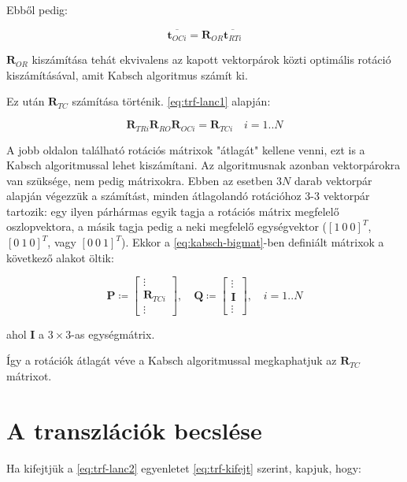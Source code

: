 	Ebből pedig:
	
	\begin{equation}
 	\overline{\mathbf{t}_{OCi}}	= \mathbf{R}_{OR} 	\overline{\mathbf{t}_{RTi}}
	\end{equation}
	
	$\mathbf{R}_{OR}$ kiszámítása tehát ekvivalens az kapott vektorpárok közti optimális rotáció kiszámításával, amit Kabsch algoritmus számít ki.
	
	Ez után $\mathbf{R}_{TC}$ számítása történik. \eqref{eq:trf-lanc1} alapján: 
	
	\begin{equation}
	\mathbf{R}_{TRi}\mathbf{R}_{RO}\mathbf{R}_{OCi} = \mathbf{R}_{TCi}\quad i = 1 .. N
	\end{equation}
	
	A jobb oldalon található rotációs mátrixok "átlagát" kellene venni, ezt is a Kabsch algoritmussal lehet kiszámítani. Az algoritmusnak azonban vektorpárokra van szüksége, nem pedig mátrixokra. Ebben az esetben $3N$ darab vektorpár alapján végezzük a számítást, minden átlagolandó rotációhoz 3-3 vektorpár tartozik: egy ilyen párhármas egyik tagja a rotációs mátrix megfelelő oszlopvektora, a másik tagja pedig a neki megfelelő egységvektor ($\left[1\:0\:0 \right]^T $, $\left[0\: 1\: 0 \right]^T $, vagy $\left[0\: 0\: 1 \right]^T $). Ekkor a \eqref{eq:kabsch-bigmat}-ben definiált mátrixok a következő alakot öltik:
	
	\begin{equation}
	\mathbf{P} \coloneqq \left[ \begin{matrix}
		\vdots \\
		\mathbf{R}_{TCi} \\
		\vdots
		\end{matrix} \right], \quad
	\mathbf{Q} \coloneqq \left[ \begin{matrix}
		\vdots \\
		\mathbf{I} \\
		\vdots
		\end{matrix} \right], \quad
		i = 1..N
	\end{equation}
	
	ahol $\mathbf{I}$ a $3\times 3$-as egységmátrix.
	
	Így a rotációk átlagát véve a Kabsch algoritmussal megkaphatjuk az $\mathbf{R}_{TC}$ mátrixot.
	
	\section{A transzlációk becslése}
	Ha kifejtjük a \eqref{eq:trf-lanc2} egyenletet \eqref{eq:trf-kifejt} szerint, kapjuk, hogy:
	
